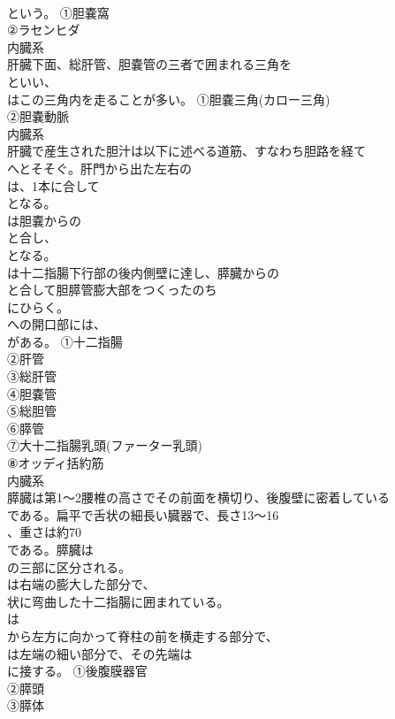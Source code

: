 \documentclass[8pt]{extreport}
\begin{document}
\begin{CJK}{UTF8}{min}
\\	という。	①胆嚢窩
\\	②ラセンヒダ
\\	内臓系
\\	肝臓下面、総肝管、胆嚢管の三者で囲まれる三角を
\\	といい、
\\	はこの三角内を走ることが多い。	①胆嚢三角(カロー三角)
\\	②胆嚢動脈
\\	内臓系
\\	肝臓で産生された胆汁は以下に述べる道筋、すなわち胆路を経て
\\	へとそそぐ。肝門から出た左右の
\\	は、1本に合して
\\	となる。
\\	は胆嚢からの
\\	と合し、
\\	となる。
\\	は十二指腸下行部の後内側壁に達し、膵臓からの
\\	と合して胆膵管膨大部をつくったのち
\\	にひらく。
\\	への開口部には、
\\	がある。	①十二指腸
\\	②肝管
\\	③総肝管
\\	④胆嚢管
\\	⑤総胆管
\\	⑥膵管
\\	⑦大十二指腸乳頭(ファーター乳頭)
\\	⑧オッディ括約筋
\\	内臓系
\\	膵臓は第1～2腰椎の高さでその前面を横切り、後腹壁に密着している
\\	である。扁平で舌状の細長い臓器で、長さ13～16
\\	、重さは約70
\\	である。膵臓は
\\	の三部に区分される。
\\	は右端の膨大した部分で、
\\	状に弯曲した十二指腸に囲まれている。
\\	は
\\	から左方に向かって脊柱の前を横走する部分で、
\\	は左端の細い部分で、その先端は
\\	に接する。	①後腹膜器官
\\	②膵頭
\\	③膵体

\end{CJK}
\end{document}
